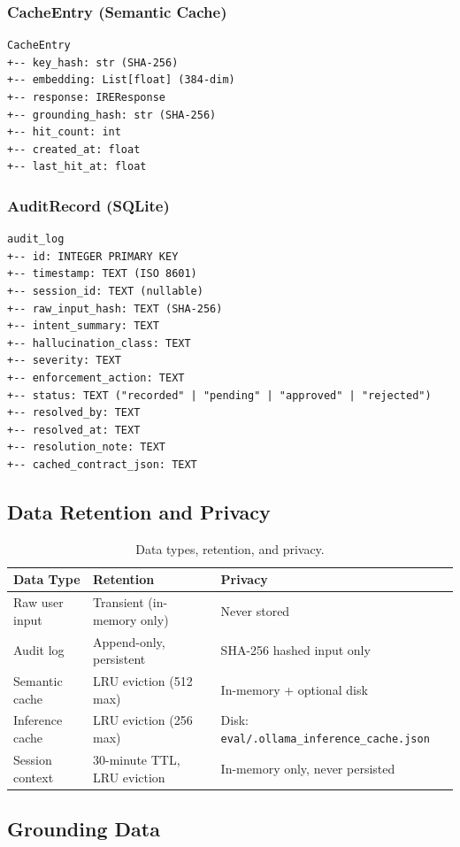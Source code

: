\documentclass[10pt,journal,onecolumn]{IEEEtran}
\begin{document}
\subsubsection{CacheEntry (Semantic Cache)}
\begin{lstlisting}
CacheEntry
+-- key_hash: str (SHA-256)
+-- embedding: List[float] (384-dim)
+-- response: IREResponse
+-- grounding_hash: str (SHA-256)
+-- hit_count: int
+-- created_at: float
+-- last_hit_at: float
\end{lstlisting}

\subsubsection{AuditRecord (SQLite)}
\begin{lstlisting}
audit_log
+-- id: INTEGER PRIMARY KEY
+-- timestamp: TEXT (ISO 8601)
+-- session_id: TEXT (nullable)
+-- raw_input_hash: TEXT (SHA-256)
+-- intent_summary: TEXT
+-- hallucination_class: TEXT
+-- severity: TEXT
+-- enforcement_action: TEXT
+-- status: TEXT ("recorded" | "pending" | "approved" | "rejected")
+-- resolved_by: TEXT
+-- resolved_at: TEXT
+-- resolution_note: TEXT
+-- cached_contract_json: TEXT
\end{lstlisting}

\subsection{Data Retention and Privacy}
\begin{table}[t]
\caption{Data types, retention, and privacy.}
\label{tab:retention}
\begin{tabularx}{\textwidth}{l X X}
\toprule
\textbf{Data Type} & \textbf{Retention} & \textbf{Privacy}\\
\midrule
Raw user input & Transient (in-memory only) & Never stored\\
Audit log & Append-only, persistent & SHA-256 hashed input only\\
Semantic cache & LRU eviction (512 max) & In-memory + optional disk\\
Inference cache & LRU eviction (256 max) & Disk: \texttt{eval/.ollama\_inference\_cache.json}\\
Session context & 30-minute TTL, LRU eviction & In-memory only, never persisted\\
\bottomrule
\end{tabularx}
\end{table}

\subsection{Grounding Data}
\end{document}
